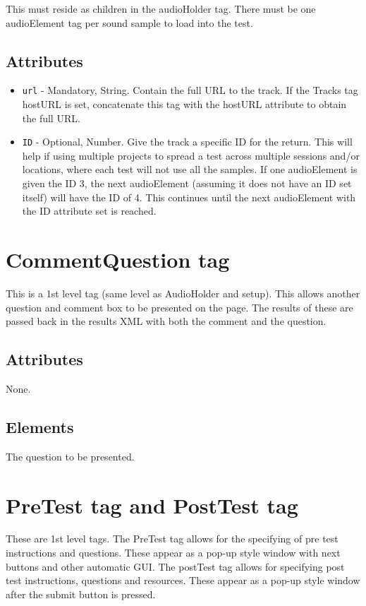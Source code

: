 \documentclass{article}
\begin{document}
This must reside as children in the audioHolder tag. There must be one audioElement tag per sound sample to load into the test.

\subsection{Attributes}
\begin{itemize}
\item \texttt{url} - Mandatory, String. Contain the full URL to the track. If the Tracks tag hostURL is set, concatenate this tag with the hostURL attribute to obtain the full URL.
\item \texttt{ID} - Optional, Number. Give the track a specific ID for the return. This will help if using multiple projects to spread a test across multiple sessions and/or locations, where each test will not use all the samples. If one audioElement is given the ID 3, the next audioElement (assuming it does not have an ID set itself) will have the ID of 4. This continues until the next audioElement with the ID attribute set is reached.
\end{itemize}

\section {CommentQuestion tag}

This is a 1st level tag (same level as AudioHolder and setup). This allows another question and comment box to be presented on the page. The results of these are passed back in the results XML with both the comment and the question.

\subsection{Attributes}
None.

\subsection{Elements}
The question to be presented.

\section {PreTest tag and PostTest tag}

These are 1st level tags. The PreTest tag allows for the specifying of pre test instructions and questions. These appear as a pop-up style window with next buttons and other automatic GUI. The postTest tag allows for specifying post test instructions, questions and resources. These appear as a pop-up style window after the submit button is pressed.
\end{document}
